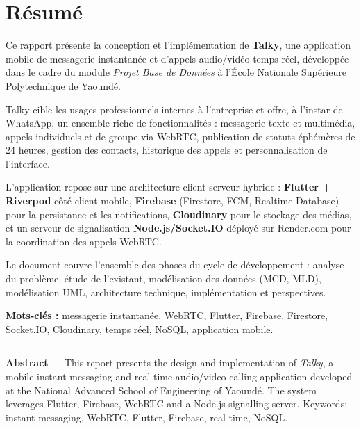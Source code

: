 \documentclass[12pt,a4paper]{report}
\begin{document}
\newpage\thispagestyle{empty}
\chapter*{Résumé}

Ce rapport présente la conception et l'implémentation de \textbf{Talky}, une application mobile de messagerie instantanée et d'appels audio/vidéo temps réel, développée dans le cadre du module \textit{Projet Base de Données} à l'École Nationale Supérieure Polytechnique de Yaoundé.

Talky cible les usages professionnels internes à l'entreprise et offre, à l'instar de WhatsApp, un ensemble riche de fonctionnalités : messagerie texte et multimédia, appels individuels et de groupe via WebRTC, publication de statuts éphémères de 24 heures, gestion des contacts, historique des appels et personnalisation de l'interface.

L'application repose sur une architecture client-serveur hybride : \textbf{Flutter + Riverpod} côté client mobile, \textbf{Firebase} (Firestore, FCM, Realtime Database) pour la persistance et les notifications, \textbf{Cloudinary} pour le stockage des médias, et un serveur de signalisation \textbf{Node.js/Socket.IO} déployé sur Render.com pour la coordination des appels WebRTC.

Le document couvre l'ensemble des phases du cycle de développement : analyse du problème, étude de l'existant, modélisation des données (MCD, MLD), modélisation UML, architecture technique, implémentation et perspectives.

\medskip
\textbf{Mots-clés :} messagerie instantanée, WebRTC, Flutter, Firebase, Firestore, Socket.IO, Cloudinary, temps réel, NoSQL, application mobile.

\vspace{0.8cm}
\begin{center}\rule{8cm}{0.5pt}\end{center}
\vspace{0.4cm}

\textbf{Abstract} --- This report presents the design and implementation of \textit{Talky}, a mobile instant-messaging and real-time audio/video calling application developed at the National Advanced School of Engineering of Yaoundé. The system leverages Flutter, Firebase, WebRTC and a Node.js signalling server. Keywords: instant messaging, WebRTC, Flutter, Firebase, real-time, NoSQL.
\end{document}
